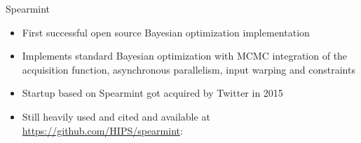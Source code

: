 \subtitle{Success Stories}

\maketitle
\begin{frame}[c]{Spearmint }

\small
\begin{itemize}
    \item First successful open source Bayesian optimization implementation     
    \item Implements standard Bayesian optimization with MCMC integration of the acquisition function, asynchronous parallelism, 
    input warping 
    and constraints
    \item \alert{Startup based on Spearmint got acquired by Twitter in 2015}
    \item Still heavily used and cited and available at \url{https://github.com/HIPS/spearmint}:
    \begin{center}
        
        
    \end{center}
\end{itemize}
\end{frame}

